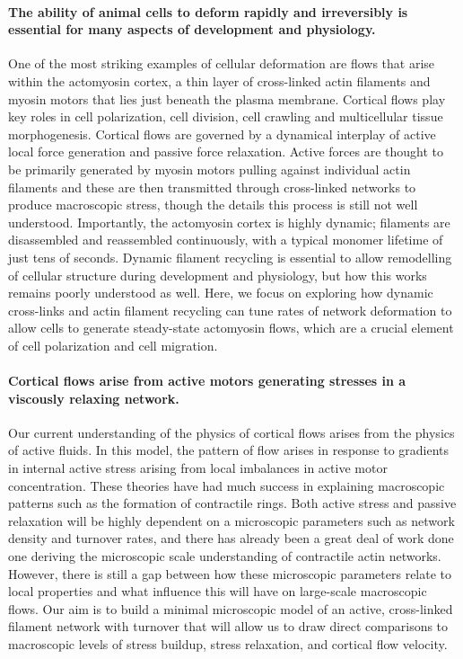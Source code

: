 \documentclass[10pt,letterpaper]{article}
\begin{document}
\paragraph{The ability of animal cells to deform rapidly and irreversibly is essential for many aspects of development and physiology.}  One of the most striking examples of cellular deformation are flows that arise within the actomyosin cortex, a thin layer of cross-linked actin filaments and myosin motors that lies just beneath the plasma membrane. Cortical flows play key roles in cell polarization, cell division, cell crawling and multicellular tissue morphogenesis\cite{cellmech_flows3,cellmech_flows2}.  Cortical flows are governed by a dynamical interplay of active local force generation and passive force relaxation.  Active forces are thought to be primarily generated by myosin motors pulling against individual actin filaments and these are then transmitted through cross-linked networks to produce macroscopic stress\cite{Munro2004413}, though the details this process is still not well understood. Importantly, the actomyosin cortex is highly dynamic; filaments are disassembled and reassembled continuously, with a typical monomer lifetime of just tens of seconds. Dynamic filament recycling is essential to allow remodelling of cellular structure during development and physiology, but how this works remains poorly understood as well. Here, we focus on exploring how dynamic cross-links and actin filament recycling can tune rates of network deformation to allow cells to generate steady-state actomyosin flows, which are a crucial element of cell polarization and cell migration.

\paragraph{Cortical flows arise from active motors generating stresses in a viscously relaxing network.}  Our current understanding of the physics of cortical flows arises from the physics of active fluids\cite{cellmech_flows}.  In this model, the pattern of flow arises in response to gradients in internal active stress arising from local imbalances in active motor concentration\cite{PhysRevLett.106.028103}.  These theories have had much success in explaining macroscopic patterns such as the formation of contractile rings\cite{PhysRevLett.103.058102}.  Both active stress and passive relaxation will be highly dependent on a microscopic parameters such as network density and turnover rates, and there has already been a great deal of work done one deriving the microscopic scale understanding of contractile actin networks.  However, there is still a gap between how these microscopic parameters relate to local properties and what influence this will have on large-scale macroscopic flows.   Our aim is to build a minimal microscopic model of an active, cross-linked filament network with turnover that will allow us to draw direct comparisons to macroscopic levels of stress buildup, stress relaxation, and cortical flow velocity.
\end{document}
